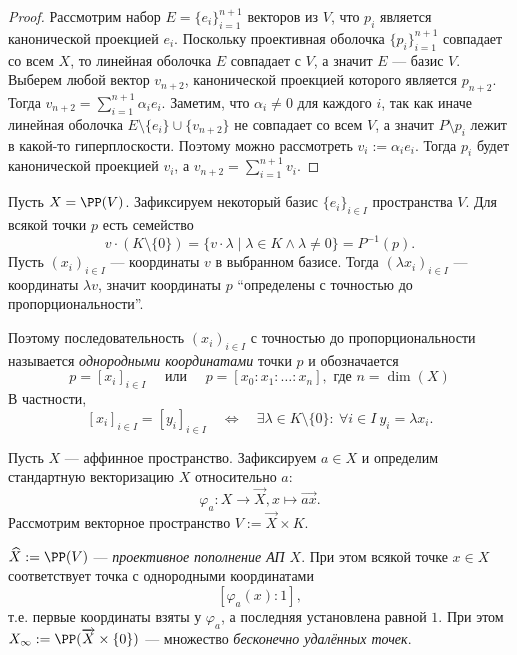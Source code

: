 \documentclass[12pt,a4paper]{article}
\begin{document}
    \begin{proof}
        Рассмотрим набор $E = \{e_i\}_{i=1}^{n+1}$ векторов из $V$, что $p_i$ является канонической проекцией $e_i$. Поскольку проективная оболочка $\{p_i\}_{i=1}^{n+1}$ совпадает со всем $X$, то линейная оболочка $E$ совпадает с $V$, а значит $E$ --- базис $V$. Выберем любой вектор $v_{n+2}$, канонической проекцией которого является $p_{n+2}$. Тогда $v_{n+2} = \sum_{i=1}^{n+1} \alpha_i e_i$. Заметим, что $\alpha_i \neq 0$ для каждого $i$, так как иначе линейная оболочка $E \setminus \{e_i\} \cup \{v_{n+2}\}$ не совпадает со всем $V$, а значит $P \setminus p_i$ лежит в какой-то гиперплоскости. Поэтому можно рассмотреть $v_i := \alpha_i e_i$. Тогда $p_i$ будет канонической проекцией $v_i$, а $v_{n+2} = \sum_{i=1}^{n+1} v_i$.
    \end{proof}

    \begin{definition}
        Пусть $X = \PP(V)$. Зафиксируем некоторый базис $\{e_i\}_{i \in I}$ пространства $V$. Для всякой точки $p$ есть семейство
        \[v \cdot (K \setminus \{0\}) = \{v \cdot \lambda \mid \lambda \in K \wedge \lambda \neq 0\} = P^{-1}(p).\]
        Пусть $(x_i)_{i \in I}$ --- координаты $v$ в выбранном базисе. Тогда $(\lambda x_i)_{i \in I}$ --- координаты $\lambda v$, значит координаты $p$ ``определены с точностью до пропорциональности''.

        Поэтому последовательность $(x_i)_{i \in I}$ с точностью до пропорциональности называется \emph{однородными координатами} точки $p$ и обозначается
        \[
            p = [x_i]_{i \in I}
            \quad \text{ или } \quad
            p = [x_0 : x_1 : \dots : x_n], \text{ где } n = \dim(X)
        \]
        В частности,
        \[
            [x_i]_{i \in I} = [y_i]_{i \in I}
            \quad \Longleftrightarrow \quad
            \exists \lambda \in K \setminus \{0\}:\ \forall i \in I\ y_i = \lambda x_i.
        \]
    \end{definition}

    \begin{definition}
        Пусть $X$ --- аффинное пространство. Зафиксируем $a \in X$ и определим стандартную векторизацию $X$ относительно $a$:
        \[\varphi_a: X \to \overrightarrow{X}, x \mapsto \overrightarrow{ax}.\]
        Рассмотрим векторное пространство $V := \overrightarrow{X} \times K$.

        $\widehat{X} := \PP(V)$ --- \emph{проективное пополнение АП $X$}. При этом всякой точке $x \in X$ соответствует точка с однородными координатами
        \[[\varphi_a(x) : 1],\]
        т.е. первые координаты взяты у $\varphi_a$, а последняя установлена равной $1$. При этом $X_\infty := \PP(\overrightarrow{X} \times \{0\})$ --- множество \emph{бесконечно удалённых точек}.
    \end{definition}
\end{document}
